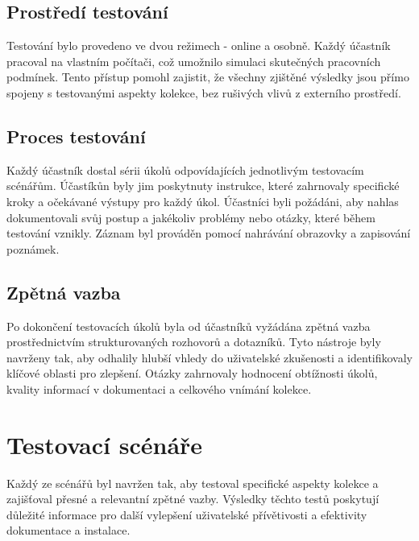 \subsection{Prostředí testování}
Testování bylo provedeno ve dvou režimech - online a osobně. Každý účastník pracoval na vlastním počítači, což umožnilo simulaci skutečných pracovních podmínek. Tento přístup pomohl zajistit, že všechny zjištěné výsledky jsou přímo spojeny s testovanými aspekty kolekce, bez rušivých vlivů z externího prostředí.

\subsection{Proces testování}
Každý účastník dostal sérii úkolů odpovídajících jednotlivým testovacím scénářům. Účastíkůn byly jim poskytnuty instrukce, které zahrnovaly specifické kroky a očekávané výstupy pro každý úkol. Účastníci byli požádáni, aby nahlas dokumentovali svůj postup a jakékoliv problémy nebo otázky, které během testování vznikly. Záznam byl prováděn pomocí nahrávání obrazovky a zapisování poznámek.

\subsection{Zpětná vazba}
Po dokončení testovacích úkolů byla od účastníků vyžádána zpětná vazba prostřednictvím strukturovaných rozhovorů a dotazníků. Tyto nástroje byly navrženy tak, aby odhalily hlubší vhledy do uživatelské zkušenosti a identifikovaly klíčové oblasti pro zlepšení. Otázky zahrnovaly hodnocení obtížnosti úkolů, kvality informací v dokumentaci a celkového vnímání kolekce.

\section{Testovací scénáře}
Každý ze scénářů byl navržen tak, aby testoval specifické aspekty kolekce a zajišťoval přesné a relevantní zpětné vazby. Výsledky těchto testů poskytují důležité informace pro další vylepšení uživatelské přívětivosti a efektivity dokumentace a instalace.

